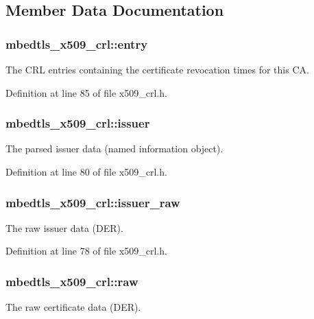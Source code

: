 \subsection{Member Data Documentation}
\hypertarget{structmbedtls__x509__crl_a880036b1b4a2b449542f8f1fa389694f}{
\subsubsection[{entry}]{ mbedtls\-\_\-x509\-\_\-crl\-::entry}}\label{structmbedtls__x509__crl_a880036b1b4a2b449542f8f1fa389694f}
The C\-R\-L entries containing the certificate revocation times for this C\-A. 

Definition at line 85 of file x509\-\_\-crl.\-h.

\hypertarget{structmbedtls__x509__crl_aae988566d13fadf805d8ad31d13b44d8}{
\subsubsection[{issuer}]{ mbedtls\-\_\-x509\-\_\-crl\-::issuer}}\label{structmbedtls__x509__crl_aae988566d13fadf805d8ad31d13b44d8}
The parsed issuer data (named information object). 

Definition at line 80 of file x509\-\_\-crl.\-h.

\hypertarget{structmbedtls__x509__crl_a009d0e1b844df85a2389ec10b770a6f6}{
\subsubsection[{issuer\-\_\-raw}]{ mbedtls\-\_\-x509\-\_\-crl\-::issuer\-\_\-raw}}\label{structmbedtls__x509__crl_a009d0e1b844df85a2389ec10b770a6f6}
The raw issuer data (D\-E\-R). 

Definition at line 78 of file x509\-\_\-crl.\-h.

\hypertarget{structmbedtls__x509__crl_a6fb756d2b65237ccaff6061f4217b2eb}{
\subsubsection[{raw}]{ mbedtls\-\_\-x509\-\_\-crl\-::raw}}\label{structmbedtls__x509__crl_a6fb756d2b65237ccaff6061f4217b2eb}
The raw certificate data (D\-E\-R). 

